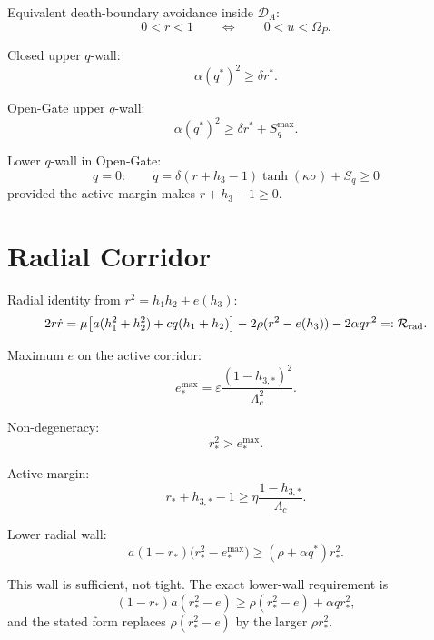 \documentclass[11pt,a4paper]{article}
\newcommand{\DA}{\mathcal D_A}
\newcommand{\Rcal}{\mathcal R}
\newcommand{\Om}{\Omega_P}
\theoremstyle{plain}
\theoremstyle{definition}
\theoremstyle{remark}
\begin{document}
Equivalent death-boundary avoidance inside $\DA$:
\begin{equation}
  0<r<1
  \qquad\Longleftrightarrow\qquad
  0<u<\Om.
\end{equation}

Closed upper $q$-wall:
\begin{equation}
  \alpha(q^*)^2\ge\delta r^*.
\end{equation}

Open-Gate upper $q$-wall:
\begin{equation}
  \boxed{\alpha(q^*)^2\ge \delta r^*+S_q^{\max}.}
\end{equation}

Lower $q$-wall in Open-Gate:
\begin{equation}
  q=0:
  \qquad
  \dot q=\delta(r+h_3-1)\tanh(\kappa\sigma)+S_q\ge0
\end{equation}
provided the active margin makes $r+h_3-1\ge0$.

\section{Radial Corridor}

Radial identity from $r^2=h_1h_2+e(h_3)$:
\begin{equation}
  2r\dot r=
  \mu\bigl[a(h_1^2+h_2^2)+cq(h_1+h_2)\bigr]
  -2\rho(r^2-e(h_3))-2\alpha q r^2
  =:\Rcal_{\rm rad}.
\end{equation}

Maximum $e$ on the active corridor:
\begin{equation}
  e_*^{\max}=\varepsilon\frac{(1-h_{3,*})^2}{\Lambda_c^2}.
\end{equation}

Non-degeneracy:
\begin{equation}
  r_*^2>e_*^{\max}.
\end{equation}

Active margin:
\begin{equation}
  r_*+h_{3,*}-1\ge \eta\frac{1-h_{3,*}}{\Lambda_c}.
\end{equation}

Lower radial wall:
\begin{equation}
  a(1-r_*)\bigl(r_*^2-e_*^{\max}\bigr)
  \ge (\rho+\alpha q^*)r_*^2.
\end{equation}

This wall is sufficient, not tight. The exact lower-wall requirement is
\begin{equation}
  (1-r_*)a(r_*^2-e)
  \ge
  \rho(r_*^2-e)+\alpha q r_*^2,
\end{equation}
and the stated form replaces \(\rho(r_*^2-e)\) by the larger \(\rho r_*^2\).
\end{document}
